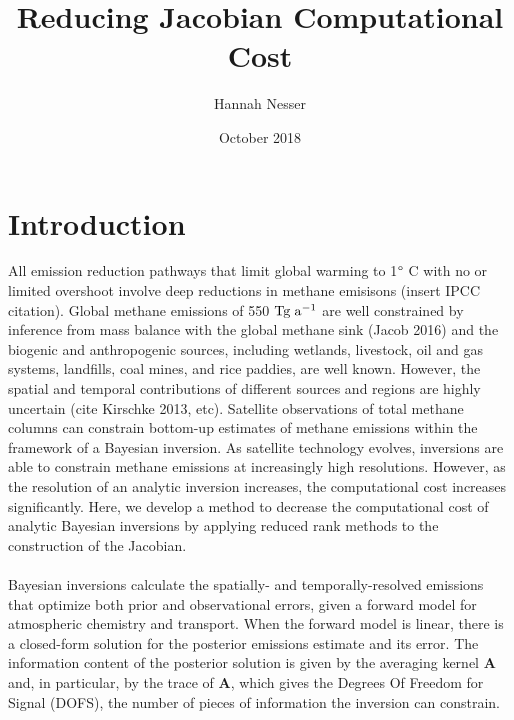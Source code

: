 \documentclass{article}
\title{Reducing Jacobian Computational Cost}
\author{Hannah Nesser}
\date{October 2018}
\newcommand{\A}{\mathbf{A}}
\begin{document}
\maketitle
\section{Introduction}
All emission reduction pathways that limit global warming to 1$\degree$ C with no or limited overshoot involve deep reductions in methane emisisons (insert IPCC citation). Global methane emissions of 550 $\mathrm{Tg \hspace{1mm} a^{-1}}$ are well constrained by inference from mass balance with the global methane sink (Jacob 2016) and the biogenic and anthropogenic sources, including wetlands, livestock, oil and gas systems, landfills, coal mines, and rice paddies, are well known. However, the spatial and temporal contributions of different sources and regions are highly uncertain (cite Kirschke 2013, etc). Satellite observations of total methane columns can constrain bottom-up estimates of methane emissions within the framework of a Bayesian inversion. As satellite technology evolves, inversions are able to constrain methane emissions at increasingly high resolutions. However, as the resolution of an analytic inversion increases, the computational cost increases significantly. Here, we develop a method to decrease the computational cost of analytic Bayesian inversions by applying reduced rank methods to the construction of the Jacobian.\\
\\
Bayesian inversions calculate the spatially- and temporally-resolved emissions that optimize both prior and observational errors, given a forward model for atmospheric chemistry and transport. When the forward model is linear, there is a closed-form solution for the posterior emissions estimate and its error. The information content of the posterior solution is given by the averaging kernel $\A$ and, in particular, by the trace of $\A$, which gives the Degrees Of Freedom for Signal (DOFS), the number of pieces of information the inversion can constrain.\\
\end{document}
